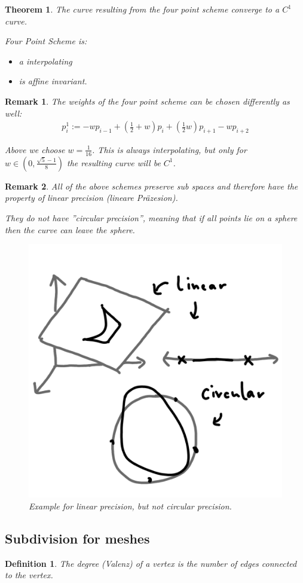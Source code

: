\documentclass[]{article}
\newtheorem{theorem}{Theorem}
\newtheorem{definition}{Definition}
\newtheorem{remark}{Remark}
\begin{document}
\begin{theorem}
	The curve resulting from the four point scheme converge to a $C^1$ curve.
	
	Four Point Scheme is:
	\begin{itemize}
		\item a interpolating
		\item is affine invariant.
	\end{itemize}
\end{theorem}

\begin{remark}
	The weights of the four point scheme can be chosen differently as well:
	\begin{align*}
		p_i^1 := -w p_{i-1} + (\frac{1}{2} + w) p_i + (\frac{1}{2} w) p_{i+1} - w p_{i+2}
	\end{align*}
	
	Above we choose $w=\frac{1}{16}$. This is always interpolating, but only for $w \in (0, \frac{\sqrt{5} - 1}{8})$ the resulting curve will be $C^1$.
\end{remark}

\begin{remark}
	All of the above schemes preserve sub spaces and therefore have the property of linear precision (lineare Präzesion).
	
	They do not have ''circular precision'', meaning that if all points lie on a sphere then the curve can leave the sphere.
	
	\begin{figure}[h!]
		\centering
		\includegraphics[width=0.3\linewidth]{figures/precision}
		\caption{Example for linear precision, but not circular precision.}
		\label{fig:precision}
	\end{figure}
\end{remark}

\subsection{Subdivision for meshes}

\begin{definition}
	The degree (Valenz) of a vertex is the number of edges connected to the vertex.
\end{definition}
\end{document}
